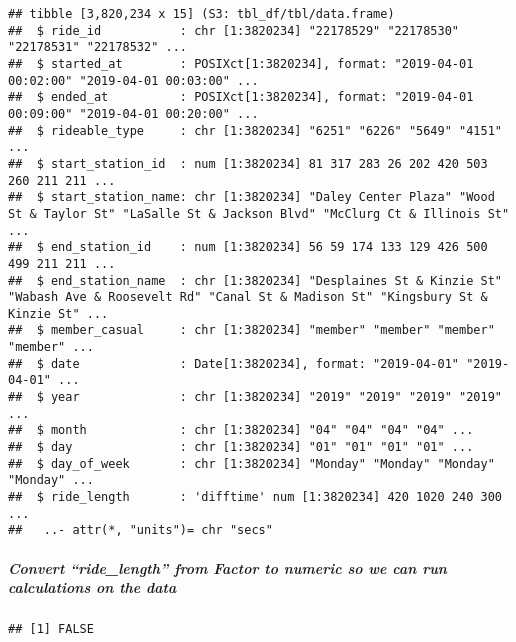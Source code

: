 \documentclass[
]{article}
\newenvironment{Shaded}{\begin{snugshade}}{\end{snugshade}}
\newcommand{\FunctionTok}[1]{\textcolor[rgb]{0.00,0.00,0.00}{#1}}
\newcommand{\NormalTok}[1]{#1}
\newcommand{\OtherTok}[1]{\textcolor[rgb]{0.56,0.35,0.01}{#1}}
\newcommand{\SpecialCharTok}[1]{\textcolor[rgb]{0.00,0.00,0.00}{#1}}
\begin{document}
\begin{verbatim}
## tibble [3,820,234 x 15] (S3: tbl_df/tbl/data.frame)
##  $ ride_id           : chr [1:3820234] "22178529" "22178530" "22178531" "22178532" ...
##  $ started_at        : POSIXct[1:3820234], format: "2019-04-01 00:02:00" "2019-04-01 00:03:00" ...
##  $ ended_at          : POSIXct[1:3820234], format: "2019-04-01 00:09:00" "2019-04-01 00:20:00" ...
##  $ rideable_type     : chr [1:3820234] "6251" "6226" "5649" "4151" ...
##  $ start_station_id  : num [1:3820234] 81 317 283 26 202 420 503 260 211 211 ...
##  $ start_station_name: chr [1:3820234] "Daley Center Plaza" "Wood St & Taylor St" "LaSalle St & Jackson Blvd" "McClurg Ct & Illinois St" ...
##  $ end_station_id    : num [1:3820234] 56 59 174 133 129 426 500 499 211 211 ...
##  $ end_station_name  : chr [1:3820234] "Desplaines St & Kinzie St" "Wabash Ave & Roosevelt Rd" "Canal St & Madison St" "Kingsbury St & Kinzie St" ...
##  $ member_casual     : chr [1:3820234] "member" "member" "member" "member" ...
##  $ date              : Date[1:3820234], format: "2019-04-01" "2019-04-01" ...
##  $ year              : chr [1:3820234] "2019" "2019" "2019" "2019" ...
##  $ month             : chr [1:3820234] "04" "04" "04" "04" ...
##  $ day               : chr [1:3820234] "01" "01" "01" "01" ...
##  $ day_of_week       : chr [1:3820234] "Monday" "Monday" "Monday" "Monday" ...
##  $ ride_length       : 'difftime' num [1:3820234] 420 1020 240 300 ...
##   ..- attr(*, "units")= chr "secs"
\end{verbatim}

\hypertarget{convert-ride_length-from-factor-to-numeric-so-we-can-run-calculations-on-the-data}{%
\subparagraph{Convert ``ride\_length'' from Factor to numeric so we can
run calculations on the
data}\label{convert-ride_length-from-factor-to-numeric-so-we-can-run-calculations-on-the-data}}

\begin{Shaded}
\end{Shaded}

\begin{verbatim}
## [1] FALSE
\end{verbatim}

\begin{Shaded}
\end{Shaded}
\end{document}
